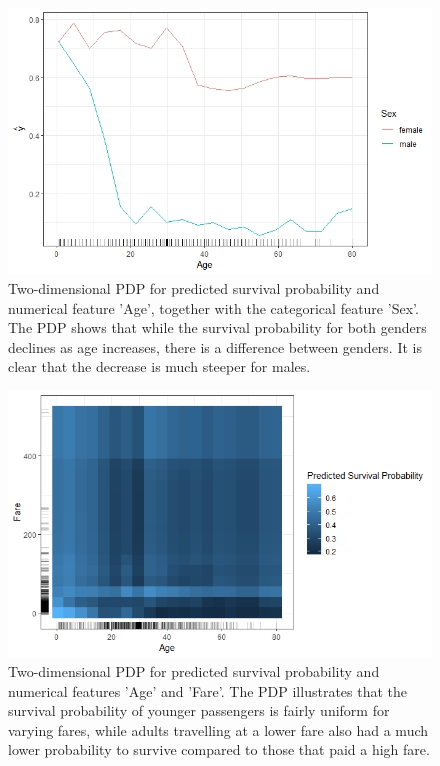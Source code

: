 \documentclass[
]{krantz}
\begin{document}
\begin{figure}

{\centering \includegraphics[width=0.8\linewidth]{images/PDP_Plot_3} 

}

\caption{Two-dimensional PDP for predicted survival probability and numerical feature 'Age', together with the categorical feature 'Sex'. The PDP shows that while the survival probability for both genders declines as age increases, there is a difference between genders. It is clear that the decrease is much steeper for males.}\label{fig:plot3}
\end{figure}

\begin{figure}

{\centering \includegraphics[width=0.8\linewidth]{images/PDP_Plot_4} 

}

\caption{Two-dimensional PDP for predicted survival probability and numerical features 'Age' and 'Fare'. The PDP illustrates that the survival probability of younger passengers is fairly uniform for varying fares, while adults travelling at a lower fare also had a much lower probability to survive compared to those that paid a high fare.}\label{fig:plot4}
\end{figure}
\end{document}
